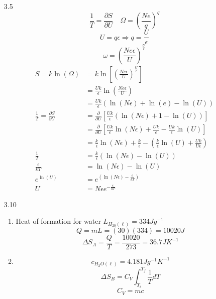 \documentclass{article}
\begin{document}
\begin{enumerate}
    \item [3.5]
        \[\frac{1}{T} = \frac{\partial S}{\partial U} \quad \Omega = \left( \frac{Ne}{q} \right)^q\]
        \[U = q \epsilon \Rightarrow q = \frac{U}{\epsilon}\]
        \[\omega = \left( \frac{Ne \epsilon}{U} \right)^{\frac{U}{\epsilon}}\]
        \begin{align*}
            S = k \ln(\Omega) &= k\ln\left[ \left( \frac{Ne \epsilon}{U} \right)^{\frac{U}{\epsilon}} \right] \\
            &= \frac{Uk}{\epsilon} \ln\left( \frac{Ne \epsilon}{U} \right) \\
            &= \frac{Uk}{\epsilon}(\ln(N \epsilon) + \ln(e) - \ln(U)) \\
            \frac{1}{T} = \frac{\partial S}{\partial U} &= \frac{\partial}{\partial U}\left[ \frac{Uk}{\epsilon}(\ln(N \epsilon) + 1 - \ln(U)) \right] \\
            &= \frac{\partial}{\partial U}\left[ \frac{Uk}{\epsilon} \ln(N \epsilon) + \frac{Uk}{\epsilon} - \frac{Uk}{\epsilon} \ln(U) \right] \\
            &= \frac{k}{\epsilon} \ln(N \epsilon) + \frac{k}{\epsilon} - \left( \frac{k}{\epsilon} \ln(U) + \frac{Uk}{U \epsilon} \right) \\
            \frac{1}{T} &= \frac{k}{\epsilon} (\ln(N \epsilon) - \ln(U)) \\
            \frac{\epsilon}{kT} &= \ln(N \epsilon) - \ln(U) \\
            e^{\ln(U)} &= e^{\left( \ln(N \epsilon) - \frac{\epsilon}{kT} \right)} \\
            U &= N \epsilon e^{-\frac{\epsilon}{kT}}
        \end{align*}
    \vspace{0.1in}
    \item [3.10]
        \begin{enumerate}
            \item
                Heat of formation for water \(L_{H_20(\ell)} = 334 Jg^{-1}\)
                \[Q = mL = (30)(334) = 10020 J\]
                \[\Delta S_A = \frac{Q}{T} = \frac{10020}{273} = 36.7 JK^{-1}\]
            \item
                \[c_{H_2O(\ell)} = 4.181 Jg^{-1}K^{-1}\]
                \[\Delta S_B = C_V \int_{T_i}^{T_f} \frac{1}{T} dT\]
                \[C_V = mc\]

\end{enumerate}
\end{enumerate}
\end{document}
